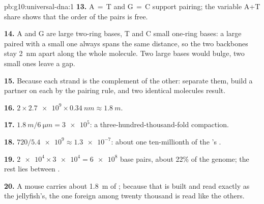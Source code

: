\begin{solution}{pb:g10:universal-dna:1}
\textbf{13.} A$\,=\,$T and G$\,=\,$C support pairing; the variable
A+T share shows that the order of the pairs is free.

\textbf{14.} A and G are large two-ring bases, T and C small one-ring
bases: a large paired with a small one always spans the same distance,
so the two backbones stay \qty{2}{nm} apart along the whole molecule.
Two large bases would bulge, two small ones leave a gap.

\textbf{15.} Because each strand is the complement of the other:
separate them, build a partner on each by the pairing rule, and two
identical molecules result.

\textbf{16.} $2 \times \num{2.7e9} \times \qty{0.34}{nm} \approx
\qty{1.8}{m}$.

\textbf{17.} $\qty{1.8}{m} / \qty{6}{\micro m} = \num{3e5}$: a
three-hundred-thousand-fold compaction.

\textbf{18.} $720 / \num{5.4e9} \approx \num{1.3e-7}$: about one
ten-millionth of the 's .

\textbf{19.} $\num{2e4} \times \num{3e4} = \num{6e8}$ base pairs, about
22\% of the genome; the rest lies between .

\textbf{20.} A mouse  carries about \qty{1.8}{m} of ; because
that  is built and read exactly as the jellyfish's, the one foreign
 among twenty thousand is read like the others.
\end{solution}
